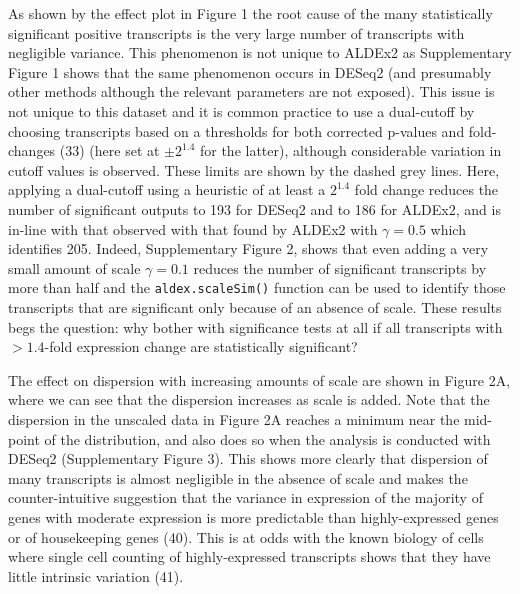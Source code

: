 \documentclass[
]{article}
\begin{document}
As shown by the effect plot in Figure 1 the root cause of the many
statistically significant positive transcripts is the very large number
of transcripts with negligible variance. This phenomenon is not unique
to ALDEx2 as Supplementary Figure 1 shows that the same phenomenon
occurs in DESeq2 (and presumably other methods although the relevant
parameters are not exposed). This issue is not unique to this dataset
and it is common practice to use a dual-cutoff by choosing transcripts
based on a thresholds for both corrected p-values and fold-changes (33)
(here set at \(\pm 2^{1.4}\) for the latter), although considerable
variation in cutoff values is observed. These limits are shown by the
dashed grey lines. Here, applying a dual-cutoff using a heuristic of at
least a \(2^{1.4}\) fold change reduces the number of significant
outputs to 193 for DESeq2 and to 186 for ALDEx2, and is in-line with
that observed with that found by ALDEx2 with \(\gamma = 0.5\) which
identifies 205. Indeed, Supplementary Figure 2, shows that even adding a
very small amount of scale \(\gamma = 0.1\) reduces the number of
significant transcripts by more than half and the
\texttt{aldex.scaleSim()} function can be used to identify those
transcripts that are significant only because of an absence of scale.
These results begs the question: why bother with significance tests at
all if all transcripts with \(> 1.4\)-fold expression change are
statistically significant?

The effect on dispersion with increasing amounts of scale are shown in
Figure 2A, where we can see that the dispersion increases as scale is
added. Note that the dispersion in the unscaled data in Figure 2A
reaches a minimum near the mid-point of the distribution, and also does
so when the analysis is conducted with DESeq2 (Supplementary Figure 3).
This shows more clearly that dispersion of many transcripts is almost
negligible in the absence of scale and makes the counter-intuitive
suggestion that the variance in expression of the majority of genes with
moderate expression is more predictable than highly-expressed genes or
of housekeeping genes (40). This is at odds with the known biology of
cells where single cell counting of highly-expressed transcripts shows
that they have little intrinsic variation (41).
\end{document}
